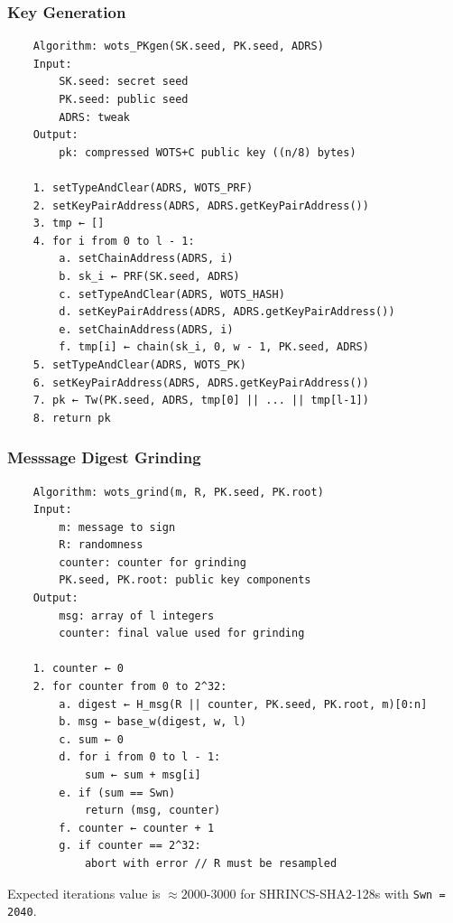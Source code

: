 \subsubsection{Key Generation}
\begin{verbatim}
    Algorithm: wots_PKgen(SK.seed, PK.seed, ADRS)
    Input:
        SK.seed: secret seed
        PK.seed: public seed
        ADRS: tweak 
    Output:
        pk: compressed WOTS+C public key ((n/8) bytes)

    1. setTypeAndClear(ADRS, WOTS_PRF)
    2. setKeyPairAddress(ADRS, ADRS.getKeyPairAddress())
    3. tmp ← []
    4. for i from 0 to l - 1:
        a. setChainAddress(ADRS, i)
        b. sk_i ← PRF(SK.seed, ADRS)
        c. setTypeAndClear(ADRS, WOTS_HASH)
        d. setKeyPairAddress(ADRS, ADRS.getKeyPairAddress())
        e. setChainAddress(ADRS, i)
        f. tmp[i] ← chain(sk_i, 0, w - 1, PK.seed, ADRS)
    5. setTypeAndClear(ADRS, WOTS_PK)
    6. setKeyPairAddress(ADRS, ADRS.getKeyPairAddress())
    7. pk ← Tw(PK.seed, ADRS, tmp[0] || ... || tmp[l-1])
    8. return pk
\end{verbatim}


\subsubsection{Messsage Digest Grinding}
\begin{verbatim}
    Algorithm: wots_grind(m, R, PK.seed, PK.root)
    Input:
        m: message to sign
        R: randomness 
        counter: counter for grinding
        PK.seed, PK.root: public key components
    Output:
        msg: array of l integers
        counter: final value used for grinding

    1. counter ← 0 
    2. for counter from 0 to 2^32:    
        a. digest ← H_msg(R || counter, PK.seed, PK.root, m)[0:n]
        b. msg ← base_w(digest, w, l)
        c. sum ← 0
        d. for i from 0 to l - 1:
            sum ← sum + msg[i]
        e. if (sum == Swn)
            return (msg, counter)
        f. counter ← counter + 1
        g. if counter == 2^32:
            abort with error // R must be resampled
\end{verbatim}
Expected iterations value is $\approx 2000\text{-}3000$ for SHRINCS-SHA2-128s with \texttt{Swn = 2040}.

